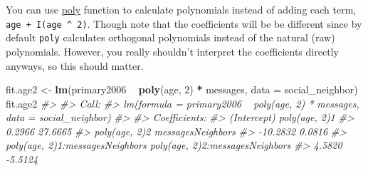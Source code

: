\documentclass[]{book}
\newenvironment{Shaded}{\begin{snugshade}}{\end{snugshade}}
\newcommand{\KeywordTok}[1]{\textcolor[rgb]{0.13,0.29,0.53}{\textbf{#1}}}
\newcommand{\DataTypeTok}[1]{\textcolor[rgb]{0.13,0.29,0.53}{#1}}
\newcommand{\DecValTok}[1]{\textcolor[rgb]{0.00,0.00,0.81}{#1}}
\newcommand{\StringTok}[1]{\textcolor[rgb]{0.31,0.60,0.02}{#1}}
\newcommand{\CommentTok}[1]{\textcolor[rgb]{0.56,0.35,0.01}{\textit{#1}}}
\newcommand{\OperatorTok}[1]{\textcolor[rgb]{0.81,0.36,0.00}{\textbf{#1}}}
\newcommand{\NormalTok}[1]{#1}
\theoremstyle{definition}
\theoremstyle{definition}
\theoremstyle{definition}
\theoremstyle{remark}
\begin{document}
\begin{Shaded}
\end{Shaded}

You can use
\href{https://www.rdocumentation.org/packages/base/topics/poly}{poly}
function to calculate polynomials instead of adding each term,
\texttt{age\ +\ I(age\ \^{}\ 2)}. Though note that the coefficients will
be be different since by default \texttt{poly} calculates orthogonal
polynomials instead of the natural (raw) polynomials. However, you
really shouldn't interpret the coefficients directly anyways, so this
should matter.

\begin{Shaded}
\begin{Highlighting}[]
\NormalTok{fit.age2 <-}\StringTok{ }\KeywordTok{lm}\NormalTok{(primary2006 }\OperatorTok{~}\StringTok{ }\KeywordTok{poly}\NormalTok{(age, }\DecValTok{2}\NormalTok{) }\OperatorTok{*}\StringTok{ }\NormalTok{messages,}
               \DataTypeTok{data =}\NormalTok{ social_neighbor)}
\NormalTok{fit.age2}
\CommentTok{#> }
\CommentTok{#> Call:}
\CommentTok{#> lm(formula = primary2006 ~ poly(age, 2) * messages, data = social_neighbor)}
\CommentTok{#> }
\CommentTok{#> Coefficients:}
\CommentTok{#>                     (Intercept)                    poly(age, 2)1  }
\CommentTok{#>                          0.2966                          27.6665  }
\CommentTok{#>                   poly(age, 2)2                messagesNeighbors  }
\CommentTok{#>                        -10.2832                           0.0816  }
\CommentTok{#> poly(age, 2)1:messagesNeighbors  poly(age, 2)2:messagesNeighbors  }
\CommentTok{#>                          4.5820                          -5.5124}
\end{Highlighting}
\end{Shaded}
\end{document}
